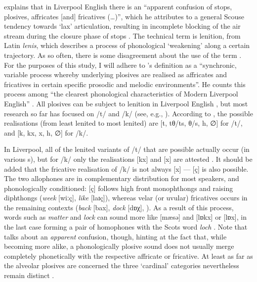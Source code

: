 \textcite[251]{knowles1973} explains that in Liverpool English there is an ``apparent confusion of stops, plosives, affricates [and] fricatives (\ldots)'', which he attributes to a general Scouse tendency towards `lax' articulation, resulting in incomplete blocking of the air stream during the closure phase of stops \parencite[cf.][107]{knowles1973}.
The technical term is lenition, from Latin \emph{lenis}, which describes a process of phonological `weakening' along a certain trajectory.
As so often, there is some disagreement about the use of the term \parencite[cf.][196]{watson2002}. For the purposes of this study, I will adhere to \citeauthor{honeybone2007}'s definition as a ``synchronic, variable process whereby underlying plosives are realised as affricates and fricatives in certain specific prosodic and melodic environments''.
He counts this process among ``the clearest phonological characteristics of Modern Liverpool English'' \citeyearpar[129]{honeybone2007}.
All plosives can be subject to lenition in Liverpool English \citep[cf.][236]{honeybone2001}, but most research so far has focused on /t/ and /k/ (see, e.g., \citealt{honeybone2001, sangster2001, watson2002, watson2006}).
According to \textcite[236]{honeybone2001}, the possible realisations (from least lenited to most lenited) are [t, tθ/ts, θ/s, h, ∅] for /t/, and [k, kx, x, h, ∅] for /k/.

In Liverpool, all of the lenited variants of /t/ that are possible actually occur (in various s), but for /k/ only the realisations [kx] and [x] are attested \parencite[cf][242]{honeybone2001}.
It should be added that the fricative realisation of /k/ is not always [x] --- [ç] is also possible.
The two allophones are in complementary distribution for most speakers, and phonologically conditioned: [ç] follows high front monophthongs and raising diphthongs (\emph{week} [wiːç], \emph{like} [laɪç]), whereas velar (or uvular) fricatives occurs in the remaining contexts (\emph{back} [bax], \emph{dock} [dɒχ], \citealp[cf.][353]{watson2007}).
As a result of this process, words such as \emph{matter} and \emph{lock} can sound more like [mæsə] and [lɒkx] or [lɒx], in the last case forming a pair of homophones with the Scots word \emph{loch} \citep[cf.][73]{trudgill1999}.
Note that \cite{knowles1973} talks about an \emph{apparent} confusion, though, hinting at the fact that, while becoming more alike, a phonologically plosive sound does not usually merge completely phonetically with the respective affricate or fricative.
At least as far as the alveolar plosives are concerned the three `cardinal' categories nevertheless remain distinct \parencite[cf.][327 and 252--253]{knowles1973}.

